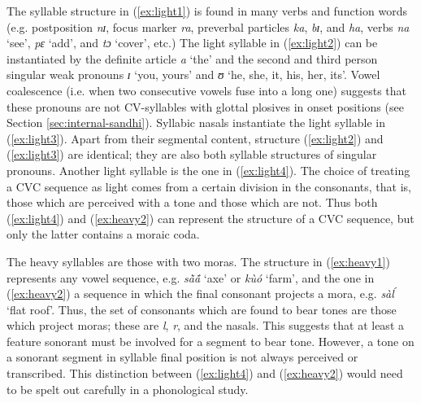 
 The syllable structure in (\ref{ex:light1}) is  found in many verbs and
function words (e.g. postposition {\it nɪ}, focus marker {\it ra},
preverbal particles  {\it ka},  {\it bɪ}, and {\it ha}, verbs {\it na} `see', 
{\it pɛ} `add',  and  {\it tɔ} `cover', etc.) The light syllable in
(\ref{ex:light2}) can be instantiated by the definite article {\it a} `the' and
the
second and third person singular weak pronouns {\it ɪ} `you, yours'  and  {\it 
ʊ}
 `he, she, it, his, her, its'. Vowel
coalescence (i.e. when two consecutive vowels fuse into a long one) suggests 
that these pronouns are not CV-syllables with glottal plosives in onset 
positions  (see Section \ref{sec:internal-sandhi}).  Syllabic nasals instantiate 
the light syllable in (\ref{ex:light3}). Apart from their segmental content, 
structure (\ref{ex:light2}) and (\ref{ex:light3}) are identical; they are also 
both syllable structures of singular pronouns.  Another light syllable is the 
one in (\ref{ex:light4}). The choice of treating a CVC sequence as light comes 
from a certain division in the consonants, that is,  those which are perceived 
with a tone and those which are not. Thus both (\ref{ex:light4}) and 
(\ref{ex:heavy2}) can represent the structure of a CVC sequence, but only the 
latter contains a moraic coda. 

The heavy syllables are those with two moras. The structure  in 
(\ref{ex:heavy1}) represents any vowel sequence, e.g. {\it sã̀ã́} `axe' or 
{\it  kùó}  `farm', and the one in (\ref{ex:heavy2}) a sequence in which the 
final consonant projects a mora, e.g.  {\it sàĺ} `flat  roof'. Thus, the set 
of consonants which are found to bear tones are those which project moras; these 
are {\it l}, {\it r},  and the nasals. This suggests  that at least a feature 
{\sc sonorant}  must be involved for a segment to bear tone. However,  a tone on 
a {\sc sonorant} segment in syllable final position is not always perceived or 
transcribed.  This distinction between (\ref{ex:light4}) and (\ref{ex:heavy2})  
would need to be spelt out carefully in a phonological study.


